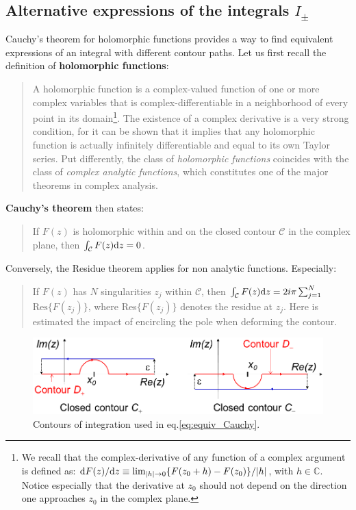 \documentclass[11pt]{article}
\newcommand{\dd}{\textrm d}
\begin{document}
\subsection{Alternative expressions of the integrals $I_\pm$}

Cauchy's theorem for holomorphic functions provides a way to find equivalent expressions of an integral with different contour paths. Let us first recall the definition of {\bf holomorphic functions}:
\begin{quote}
 A holomorphic function is a complex-valued function of one or more complex variables that is complex-differentiable in a neighborhood of every point in its domain\footnote{We recall that the complex-derivative of any function of a complex argument is defined as: $\dd F(z)/\dd z \equiv \lim_{|h|
\rightarrow 0} \{F(z_0+h)-F(z_0)\}/|h|$, with $h\in \mathbb{C}$.
Notice especially that the derivative at $z_0$ should not depend on the
direction one approaches $z_0$ in the complex plane.}. The existence of a complex derivative is a very strong condition, for it can be shown that it implies that any holomorphic function is actually infinitely differentiable and equal to its own Taylor series. Put differently, the class of \emph{holomorphic functions} coincides with the class of \emph{complex analytic functions}, which constitutes one of the major theorems in complex analysis.
\end{quote}
{\bf Cauchy's theorem} then states:
\begin{quote}
 If $F(z)$ is holomorphic within and on the closed contour $\mathcal{C}$ in the complex plane, then $\int_\mathcal{C} F(z) \dd z=0$.
\end{quote}
Conversely, the Residue theorem applies for non analytic functions. Especially:
\begin{quote}
 If $F(z)$ has $N$ singularities $z_j$ within $\mathcal{C}$, then $\int_\mathcal{C} F(z) \dd  z= 2i\pi \sum_{j=1}^N $ $\textrm{Res}\{F(z_j)\}$, where Res$\{F(z_j)\}$ denotes the residue at $z_j$. Here is estimated the impact of encircling the pole when deforming the contour.
\end{quote}

\begin{figure}[htbp]
  \begin{center}
  \includegraphics[width=14cm]{Figures/Fig_contourLandau.png}
  \end{center}
\caption{Contours of integration used in eq.\eqref{eq:equiv_Cauchy}.}
 \label{fig_Landau}
\end{figure}
\end{document}
